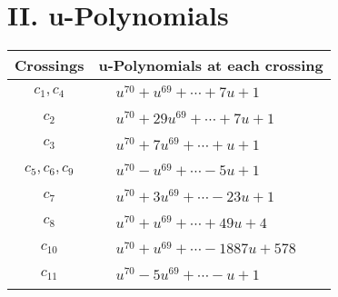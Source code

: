 \documentclass[1p]{elsarticle_modified}
\theoremstyle{definition}
\begin{document}
\newpage\renewcommand{\arraystretch}{1}
\centering \section*{ II. u-Polynomials}
\begin{tabular}{m{50pt}|m{274pt}}
Crossings & \hspace{64pt}u-Polynomials at each crossing \\
\hline $$\begin{aligned}c_{1},c_{4}\end{aligned}$$&$\begin{aligned}
&u^{70}+u^{69}+\cdots+7 u+1
\end{aligned}$\\
\hline $$\begin{aligned}c_{2}\end{aligned}$$&$\begin{aligned}
&u^{70}+29 u^{69}+\cdots+7 u+1
\end{aligned}$\\
\hline $$\begin{aligned}c_{3}\end{aligned}$$&$\begin{aligned}
&u^{70}+7 u^{69}+\cdots+u+1
\end{aligned}$\\
\hline $$\begin{aligned}c_{5},c_{6},c_{9}\end{aligned}$$&$\begin{aligned}
&u^{70}- u^{69}+\cdots-5 u+1
\end{aligned}$\\
\hline $$\begin{aligned}c_{7}\end{aligned}$$&$\begin{aligned}
&u^{70}+3 u^{69}+\cdots-23 u+1
\end{aligned}$\\
\hline $$\begin{aligned}c_{8}\end{aligned}$$&$\begin{aligned}
&u^{70}+u^{69}+\cdots+49 u+4
\end{aligned}$\\
\hline $$\begin{aligned}c_{10}\end{aligned}$$&$\begin{aligned}
&u^{70}+u^{69}+\cdots-1887 u+578
\end{aligned}$\\
\hline $$\begin{aligned}c_{11}\end{aligned}$$&$\begin{aligned}
&u^{70}-5 u^{69}+\cdots- u+1
\end{aligned}$\\
\hline
\end{tabular}\newpage\renewcommand{\arraystretch}{1}
\end{document}
